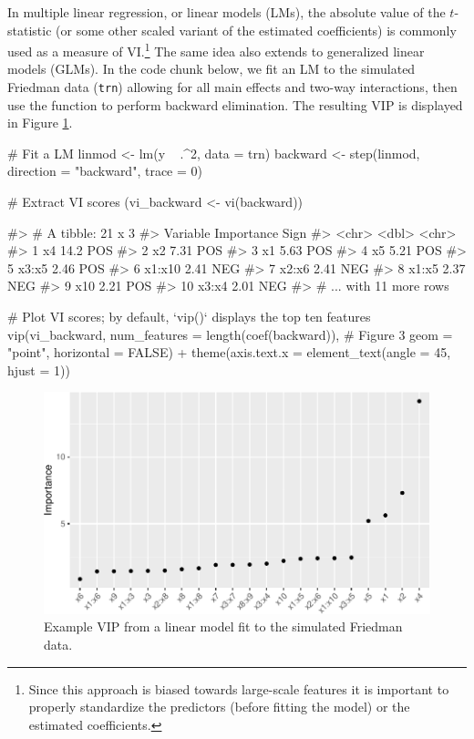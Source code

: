 In multiple linear regression, or linear models (LMs), the absolute
value of the \(t\)-statistic (or some other scaled variant of the
estimated coefficients) is commonly used as a measure of VI.\footnote{Since
  this approach is biased towards large-scale features it is important
  to properly standardize the predictors (before fitting the model) or
  the estimated coefficients.} The same idea also extends to generalized
linear models (GLMs). In the code chunk below, we fit an LM to the
simulated Friedman data (\texttt{trn}) allowing for all main effects and
two-way interactions, then use the  function to perform
backward elimination. The resulting VIP is displayed in Figure
\ref{fig:vip-step}.

\begin{Schunk}
\begin{Sinput}
# Fit a LM
linmod <- lm(y ~ .^2, data = trn)
backward <- step(linmod, direction = "backward", trace = 0)

# Extract VI scores
(vi_backward <- vi(backward))
\end{Sinput}
\begin{Soutput}
#> # A tibble: 21 x 3
#>    Variable Importance Sign 
#>    <chr>         <dbl> <chr>
#>  1 x4            14.2  POS  
#>  2 x2             7.31 POS  
#>  3 x1             5.63 POS  
#>  4 x5             5.21 POS  
#>  5 x3:x5          2.46 POS  
#>  6 x1:x10         2.41 NEG  
#>  7 x2:x6          2.41 NEG  
#>  8 x1:x5          2.37 NEG  
#>  9 x10            2.21 POS  
#> 10 x3:x4          2.01 NEG  
#> # ... with 11 more rows
\end{Soutput}
\begin{Sinput}
# Plot VI scores; by default, `vip()` displays the top ten features
vip(vi_backward, num_features = length(coef(backward)),  # Figure 3 
    geom = "point", horizontal = FALSE) +
  theme(axis.text.x = element_text(angle = 45, hjust = 1))
\end{Sinput}
\begin{figure}[!htb]

{\centering \includegraphics[width=0.7\linewidth]{greenwell-boehmke_files/figure-latex/vip-step-1} 

}

\caption[Example VIP from a linear model fit to the simulated Friedman data]{Example VIP from a linear model fit to the simulated Friedman data.}\label{fig:vip-step}
\end{figure}
\end{Schunk}

